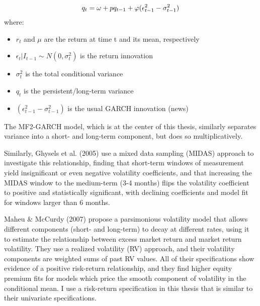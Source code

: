 \documentclass[12pt]{article}
\begin{document}
\begin{equation}
\nonumber
q_t=\omega+pq_{t-1}+\varphi(\epsilon_{t-1}^2-\sigma_{t-1}^2)\\
\end{equation}
\noindent where:
\begin{itemize}
\item $r_t$ and $\mu$ are the return at time t and its mean, respectively
\item $\epsilon_t | I_{t-1} \sim N(0,\sigma_t^2)$ is the return innovation
\item $\sigma_t^2$ is the total conditional variance
\item $q_t$ is the persistent/long-term variance
\item $(\epsilon_{t-1}^2-\sigma_{t-1}^2)$ is the usual GARCH innovation (news)
\end{itemize}
The MF2-GARCH model, which is at the center of this thesis, similarly separates variance into a short- and long-term component, but does so multiplicatively.\par
Similarly, Ghysels et al. (2005) use a mixed data sampling (MIDAS) approach to investigate this relationship, finding that short-term windows of measurement yield insignificant or even negative volatility coefficients, and that increasing the MIDAS window to the medium-term (3-4 months) flips the volatility coefficient to positive and statistically significant, with declining coefficients and model fit for windows larger than 6 months. \par
Maheu \& McCurdy (2007) propose a parsimonious volatility model that allows different components (short- and long-term) to decay at different rates, using it to estimate the relationship between excess market return and market return volatility. They use a realized volatility (RV) approach, and their volatility components are weighted sums of past RV values. All of their specifications show evidence of a positive risk-return relationship, and they find higher equity premium fits for models which price the smooth component of volatility in the conditional mean. I use a risk-return specification in this thesis that is similar to their univariate specifications. \par
\end{document}
